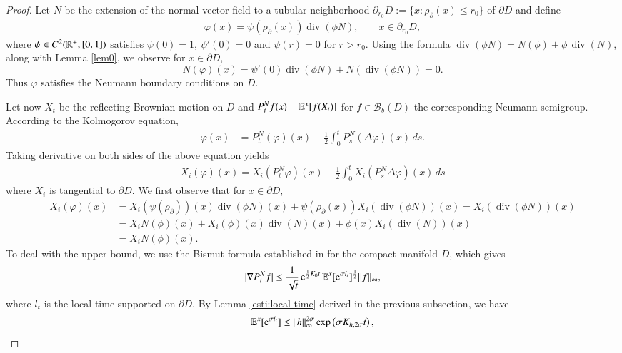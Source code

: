 \documentclass[11pt,reqno]{amsart}
\theoremstyle{definition} \newtheorem{remark}[theorem]{Remark}
\numberwithin{equation}{section}
\def\div{{\operatorname{div}}}
\newcommand\1{\mathbbm{1}}
\def\r{\right}
\def\l{\left} \def\e{\operatorname{e}} \def\dsum{\displaystyle\sum}
\begin{document}
\begin{proof}
 Let $N$ be the extension of the normal vector field to a tubular neighborhood $\partial_{r_0}D:=\{x: \rho_{\partial }(x)\leq r_0\}$ of $\partial D$ and define
 \begin{align}\label{def-varphi}
 \varphi(x)=\psi(\rho_{\partial}(x))\div (\phi N),\qquad x\in \partial_{r_0} D,
 \end{align}
 where $\psi\in C^2(\mathbb{R}^+, [0,1])$ satisfies $\psi(0)=1$, $\psi'(0)=0$ and $\psi(r)=0$ for $r>r_0$.
 Using the formula
$\div(\phi N)=N(\phi)+\phi\,\div(N)$, along with Lemma \ref{lem0}, we observe for $x\in \partial D$,
$$N(\varphi)(x)=\psi'(0)\div (\phi N)+ N(\div (\phi N))=0.$$
Thus $\varphi$ satisfies the Neumann boundary conditions on $D$.

  Let now $X_t$ be the reflecting Brownian motion on $D$ and  $P_{t}^Nf(x)=\mathbb{E}^x[f(X_t)]$ for $f\in \mathcal{B}_b(D)$ the corresponding Neumann semigroup. 
 According to the Kolmogorov equation,
 \begin{align*}
\varphi(x)&=P_{t}^{N}( \varphi)(x)-\frac{1}{2}\int_0^tP_s^{N} (\Delta \varphi)(x)\,ds.
 \end{align*}
 Taking derivative on both sides of the above equation yields
 \begin{align*}
X_i( \varphi)(x)= X_i (P_{t}^{N} \varphi)(x)-\frac{1}{2}\int_0^t
X_i ( P^N_{s}\Delta  \varphi)(x)\, ds
 \end{align*}
where $X_i$ is tangential to $\partial D$. We first observe that 
 for $x\in \partial D$,
 \begin{align*}
  X_i( \varphi)(x)&=X_i(\psi (\rho_{\partial}))(x)\div (\phi N)(x)+\psi(\rho_{\partial}(x))X_i(\div (\phi N))(x)=X_i(\div (\phi N))(x)\\
  &=X_iN(\phi)(x)+X_i(\phi)(x)\div (N)(x)+\phi(x)X_i(\div (N))(x)\\
  &=X_iN(\phi)(x).
  \end{align*}
  To deal with the upper bound, we use the Bismut formula established in \cite[Theorem 3.2.1]{Wbook2} for the
  compact manifold $D$, which gives 
 \begin{align*}
 |\nabla P_t^{N}f|\leq \frac{1}{\sqrt{t}}\e^{\frac{1}{2}K_0t} \E^x[\e^{\sigma l_t}]^{\frac{1}{2}}\|f\|_{\infty},
 \end{align*}
 where $l_t$ is the local time supported on $\partial D$. By %
 Lemma \ref{esti:local-time} derived in the previous subsection, we have
 \begin{align*}
 \E^x[\e^{\sigma l_t}]\leq \|h\|_{\infty}^{2\sigma} \exp\l(\sigma K_{h,2\sigma} t\r),

\end{align*}
\end{proof}
\end{document}
